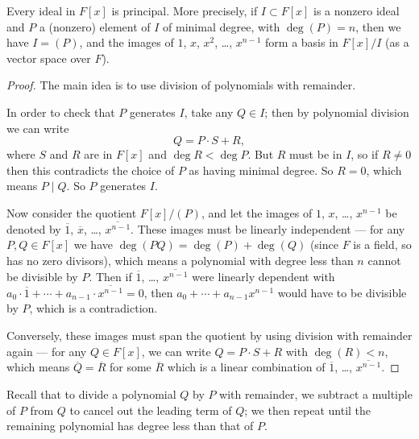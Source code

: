 \begin{proposition} \label{F[x] is a PID}
    Every ideal in $F[x]$ is principal. More precisely, if $I \subset F[x]$ is a nonzero ideal and $P$ a (nonzero) element of $I$ of minimal degree, with $\deg(P) = n$, then we have $I = (P)$, and the images of $1$, $x$, $x^2$, \ldots, $x^{n - 1}$ form a basis in $F[x]/I$ (as a vector space over $F$). 
\end{proposition}

\begin{proof}
    The main idea is to use division of polynomials with remainder. 
    
    In order to check that $P$ generates $I$, take any $Q \in I$; then by polynomial division we can write \[Q = P\cdot S + R,\] where $S$ and $R$ are in $F[x]$ and $\deg R < \deg P$. But $R$ must be in $I$, so if $R \neq 0$ then this contradicts the choice of $P$ as having minimal degree. So $R = 0$, which means $P \mid Q$. So $P$ generates $I$. 
    
    Now consider the quotient $F[x]/(P)$, and let the images of $1$, $x$, \ldots, $x^{n - 1}$ be denoted by $\overline{1}$, $\overline{x}$, \ldots, $\overline{x^{n - 1}}$. These images must be linearly independent --- for any $P, Q \in F[x]$ we have $\deg(PQ) = \deg(P) + \deg(Q)$ (since $F$ is a field, so has no zero divisors), which means a polynomial with degree less than $n$ cannot be divisible by $P$. Then if $\overline{1}$, \ldots, $\overline{x^{n - 1}}$ were linearly dependent with $a_0\cdot \overline{1} + \cdots + a_{n - 1}\cdot \overline{x^{n - 1}} = 0$, then $a_0 + \cdots + a_{n - 1}x^{n - 1}$ would have to be divisible by $P$, which is a contradiction. 
    
    Conversely, these images must span the quotient by using division with remainder again --- for any $Q \in F[x]$, we can write $Q = P \cdot S + R$ with $\deg(R) < n$, which means $\overline{Q} = \overline{R}$ for some $\overline{R}$ which is a linear combination of $\overline{1}$, \ldots, $\overline{x^{n - 1}}$.
\end{proof}

Recall that to divide a polynomial $Q$ by $P$ with remainder, we subtract a multiple of $P$ from $Q$ to cancel out the leading term of $Q$; we then repeat until the remaining polynomial has degree less than that of $P$. 

